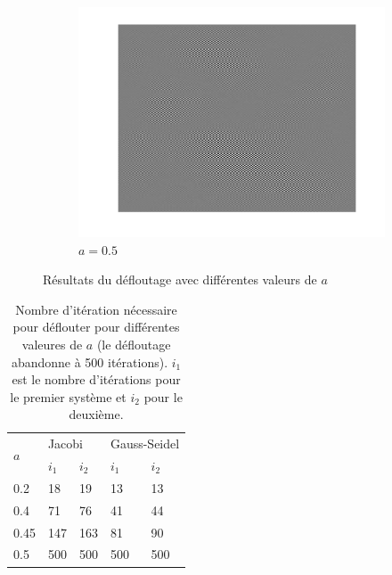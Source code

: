 \begin{figure}
\begin{subfigure}[b]{0.3\textwidth}
    \includegraphics[width=\textwidth]{Q2/unblurred_50.png}
    \caption{$a = 0.5$}
    \label{fig:a5}
  \end{subfigure}
  \caption{Résultats du défloutage avec différentes valeurs de $a$}\label{fig:adiff}
\end{figure}

\begin{table}
  \centering
  \begin{tabular}{|l|l|l|l|l|}
    \hline
    \multirow{2}{*}{$a$} & \multicolumn{2}{l|}{Jacobi} & \multicolumn{2}{l|}{Gauss-Seidel}\\
    \cline{2-5}
        & $i_1$ & $i_2$ & $i_1$ & $i_2$\\
    \hline
    0.2 & 18    & 19    & 13    & 13\\
    \hline
    0.4 & 71    & 76    & 41    & 44\\
    \hline
    0.45& 147   & 163   & 81    & 90\\
    \hline
    0.5 & 500   & 500   & 500   & 500\\
    \hline
  \end{tabular}
  \caption{Nombre d'itération nécessaire pour déflouter pour différentes valeures de $a$ (le défloutage abandonne à 500 itérations).
  $i_1$ est le nombre d'itérations pour le premier système et $i_2$ pour le deuxième.}
  \label{tab:iter}
\end{table}


